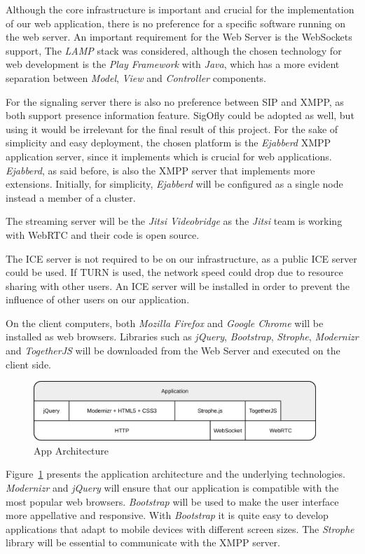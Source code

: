 Although the core infrastructure is important and crucial for the implementation of our web application, there is no preference for a specific software running on the web server. An important requirement for the Web Server is the WebSockets support, The \emph{LAMP} stack was considered, although the chosen technology for web development is the \emph{Play Framework} with \emph{Java}, which has a more evident separation between \emph{Model}, \emph{View} and \emph{Controller} components.

For the signaling server there is also no preference between \ac{SIP} and \ac{XMPP}, as both support presence information feature. \ac{SigOfly} could be adopted as well, but using it would be irrelevant for the final result of this project. For the sake of simplicity and easy deployment, the chosen platform is the \emph{Ejabberd} \ac{XMPP} application server, since it implements \cite{xep0206} which is crucial for web applications. \emph{Ejabberd}, as said before, is also the \ac{XMPP} server that implements more extensions. Initially, for simplicity, \emph{Ejabberd} will be configured as a single node instead a member of a cluster. 

The streaming server will be the \emph{Jitsi Videobridge} as the \emph{Jitsi} team is working with \ac{WebRTC} and their code is open source.

The \ac{ICE} server is not required to be on our infrastructure, as a public \ac{ICE} server could be used. If \ac{TURN} is used, the network speed could drop due to resource sharing with other users. An \ac{ICE} server will be installed in order to prevent the influence of other users on our application.

On the client computers, both \emph{Mozilla Firefox} and \emph{Google Chrome} will be installed as web browsers. Libraries such as \emph{jQuery}, \emph{Bootstrap}, \emph{Strophe}, \emph{Modernizr} and \emph{TogetherJS} will be downloaded from the Web Server and executed on the client side.

\begin{figure}[H]
	\centering
	\includegraphics[width=0.95\textwidth]{figures/apparch.png}
	\caption{App Architecture}
	        \label{fig:apparch}

\end{figure}
Figure~\ref{fig:apparch} presents the application architecture and the underlying technologies. \emph{Modernizr} and \emph{jQuery} will ensure that our application is compatible with the most popular web browsers.
\emph{Bootstrap} will be used to make the user interface more appellative and responsive. With \emph{Bootstrap} it is quite easy to develop applications that adapt to mobile devices with different screen sizes.
The \emph{Strophe} library will be essential to communicate with the \ac{XMPP} server.


